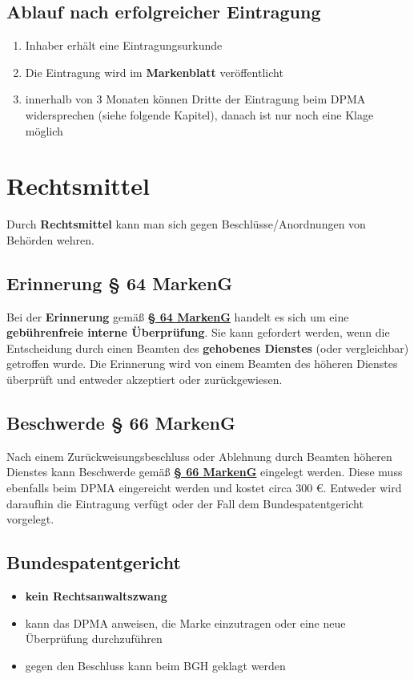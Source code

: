 \documentclass[12pt,A4]{extarticle}
\newcommand{\highlight}[1]{\textcolor{highlightColor}{\textbf{#1}}}
\newcommand{\markenG}[2][]{\textbf{\textcolor{markenGesetzLink}{\href{https://www.gesetze-im-internet.de/markeng/__#2.html}{§ #2 \ifthenelse{\equal{#1}{}}{}{#1 }MarkenG}}}}
\begin{document}
\subsection{Ablauf nach erfolgreicher Eintragung}
\begin{enumerate}
  \item{Inhaber erhält eine Eintragungsurkunde}
  \item{Die Eintragung wird im \textbf{Markenblatt} veröffentlicht}
  \item{innerhalb von 3 Monaten können Dritte der Eintragung beim DPMA widersprechen (siehe folgende Kapitel), danach ist nur noch eine Klage möglich}
\end{enumerate}

\section{Rechtsmittel}
Durch \textbf{Rechtsmittel} kann man sich gegen Beschlüsse/Anordnungen von Behörden wehren.

\subsection{Erinnerung § 64 MarkenG}
Bei der \highlight{Erinnerung} gemäß \markenG{64} handelt es sich um eine \textbf{gebührenfreie interne Überprüfung}. Sie kann gefordert werden, wenn die Entscheidung durch einen Beamten des \textbf{gehobenes Dienstes} (oder vergleichbar) getroffen wurde. Die Erinnerung wird von einem Beamten des höheren Dienstes überprüft und entweder akzeptiert oder zurückgewiesen.

\subsection{Beschwerde § 66 MarkenG}
Nach einem Zurückweisungsbeschluss oder Ablehnung durch Beamten höheren Dienstes kann Beschwerde gemäß \markenG{66} eingelegt werden. Diese muss ebenfalls beim DPMA eingereicht werden und kostet circa 300 €. Entweder wird daraufhin die Eintragung verfügt oder der Fall dem Bundespatentgericht vorgelegt.

\subsection{Bundespatentgericht}
\begin{itemize}
  \item{\textbf{kein Rechtsanwaltszwang}}
  \item{kann das DPMA anweisen, die Marke einzutragen oder eine neue Überprüfung durchzuführen}
  \item{gegen den Beschluss kann beim BGH geklagt werden}
\end{itemize}
\end{document}

